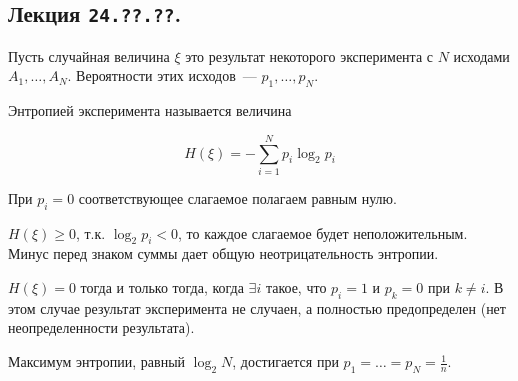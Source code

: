 \subsection{%
  Лекция \texttt{24.??.??}.%
}


Пусть случайная величина \(\xi\) это результат некоторого эксперимента с \(N\)
исходами \(A_1, \dotsc, A_N\). Вероятности этих исходов~--- \(p_1, \dotsc,
p_N\).

\begin{definition}
  Энтропией эксперимента называется величина

  \begin{equation*}
    H (\xi) = -\sum_{i = 1}^N p_i \log_2 p_i 
  \end{equation*}

  При \(p_i = 0\) соответствующее слагаемое полагаем равным нулю.
\end{definition}

\begin{remark}
  \(H (\xi) \ge 0\), т.к. \(\log_2 p_i < 0\), то каждое слагаемое будет
  неположительным. Минус перед знаком суммы дает общую неотрицательность
  энтропии.
\end{remark}

\begin{remark}
  \(H (\xi) = 0\) тогда и только тогда, когда \(\exists i\) такое, что \(p_i =
  1\) и \(p_k = 0\) при \(k \neq i\). В этом случае результат эксперимента не
  случаен, а полностью предопределен (нет неопределенности результата).
\end{remark}

\begin{lemma}
  Максимум энтропии, равный \(\log_2 N\), достигается при \(p_1 = \dotsc = p_N =
  \frac{1}{n}\).
\end{lemma}

